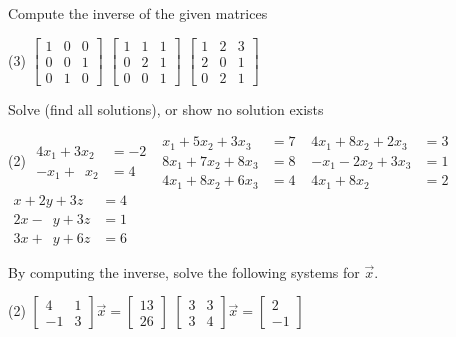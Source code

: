 \begin{exercise}
Compute the inverse of the given matrices
\begin{tasks}(3)
\task
$\begin{bmatrix}
1 & 0 & 0 \\
0 & 0 & 1 \\
0 & 1 & 0
\end{bmatrix}$
\task
$\begin{bmatrix}
1 & 1 & 1 \\
0 & 2 & 1 \\
0 & 0 & 1
\end{bmatrix}$
\task
$\begin{bmatrix}
1 & 2 & 3 \\
2 & 0 & 1 \\
0 & 2 & 1
\end{bmatrix}$
\end{tasks}
\end{exercise}

\begin{exercise}
Solve (find all solutions), or show no solution exists
\begin{tasks}(2)
\task
$\begin{aligned}
 4x_1+3x_2 & = -2 \\
 -x_1+\phantom{3} x_2 & = 4
\end{aligned}$
\task
$\begin{aligned}
  x_1+5x_2+3x_3 & = 7 \\
 8x_1+7x_2+8x_3 & = 8 \\
 4x_1+8x_2+6x_3 & = 4
\end{aligned}$
\task
$\begin{aligned}
 4x_1+8x_2+2x_3 & = 3 \\
 -x_1-2x_2+3x_3 & = 1 \\
 4x_1+8x_2 \phantom{{}+3x_3} & = 2
\end{aligned}$
\task
$\begin{aligned}
  x+2y+3z & = 4 \\
2  x-\phantom{2} y+3z & = 1 \\
3  x+\phantom{2} y+6z & = 6
\end{aligned}$
\end{tasks}
\end{exercise}

\begin{exercise}
By computing the inverse,
solve the following systems for $\vec{x}$.
\begin{tasks}(2)
\task
$\begin{bmatrix}
4 & 1 \\
-1 & 3
\end{bmatrix} \vec{x} =
\begin{bmatrix} 13 \\ 26 \end{bmatrix}$
\task
$\begin{bmatrix}
3 & 3 \\
3 & 4
\end{bmatrix} \vec{x} =
\begin{bmatrix} 2 \\ -1 \end{bmatrix}$
\end{tasks}
\end{exercise}

